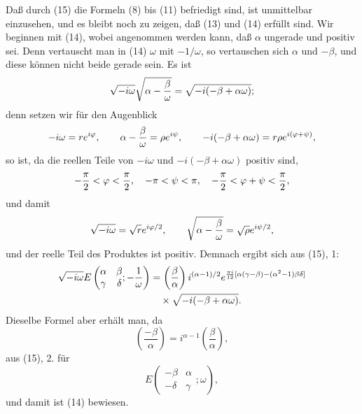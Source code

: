 \documentclass[11pt]{article}
\newcommand{\Jac}[2]{\left(\frac{#1}{#2}\right)}
\begin{document}
Daß durch (15) die Formeln (8) bis (11) befriedigt sind, ist unmittelbar einzusehen, und es bleibt noch zu zeigen, daß (13) und (14) erfüllt sind. Wir beginnen mit (14), wobei angenommen werden kann, daß $\alpha$ ungerade und positiv sei. Denn vertauscht man in (14) $\omega$ mit $-1/\omega$, so vertauschen sich $\alpha$ und $-\beta$, und diese können nicht beide gerade sein. Es ist
\[
\sqrt{-i\omega}\sqrt{\alpha-{\beta\over\omega}}=
\sqrt{-i(-\beta+\alpha\omega)};
\]
denn setzen wir für den Augenblick
\[
-i\omega=re^{i\varphi},
\qquad
\alpha-{\beta\over\omega}=\rho e^{i\psi},
\qquad
-i(-\beta+\alpha\omega)=r\rho e^{i(\varphi+\psi)},
\]
so ist, da die reellen Teile von $-i\omega$ und $-i(-\beta+\alpha\omega)$ positiv sind,
\[
-{\pi\over2}<\varphi<{\pi\over2},
\quad -\pi<\psi<\pi,
\quad -{\pi\over2}<\varphi+\psi<{\pi\over2},
\]
und damit
\[
\sqrt{-i\omega}=\sqrt r e^{i\varphi/2},
\qquad
\sqrt{\alpha-{\beta\over\omega}}=\sqrt\rho e^{i\psi/2},
\]
und der reelle Teil des Produktes ist positiv. Demnach ergibt sich aus (15), 1:
\begin{align*}
\sqrt{-i\omega}
E\left(\begin{matrix}\alpha&\beta\\ \gamma&\delta\end{matrix};-{1\over\omega}\right)
&=\Jac{\beta}{\alpha} i^{(\alpha-1)/2}
 e^{{\pi i\over12}[\alpha(\gamma-\beta)-(\alpha^2-1)\beta\delta]}\\
&\quad\times\sqrt{-i(-\beta+\alpha\omega)}.
\end{align*}
Dieselbe Formel aber erhält man, da
\[
\Jac{-\beta}{\alpha}=i^{\alpha-1}\Jac{\beta}{\alpha},
\]
aus (15), 2. für
\[
E\left(\begin{matrix}-\beta&\alpha\\ -\delta&\gamma\end{matrix};\omega\right),
\]
und damit ist (14) bewiesen.
\end{document}
